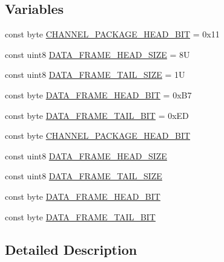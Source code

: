 \subsection*{Variables}
\begin{DoxyCompactItemize}
\item 
const byte \hyperlink{group___a_r_m_const_ga09ff0a5f36e6ede5798a5c19677d5518}{C\-H\-A\-N\-N\-E\-L\-\_\-\-P\-A\-C\-K\-A\-G\-E\-\_\-\-H\-E\-A\-D\-\_\-\-B\-I\-T} = 0x11
\item 
const uint8 \hyperlink{group___a_r_m_const_ga44f6170bf5a312cd050f5a8dbcf3d4de}{D\-A\-T\-A\-\_\-\-F\-R\-A\-M\-E\-\_\-\-H\-E\-A\-D\-\_\-\-S\-I\-Z\-E} = 8\-U
\item 
const uint8 \hyperlink{group___a_r_m_const_gae0773875f4d5422a0c8f39a7e496ab94}{D\-A\-T\-A\-\_\-\-F\-R\-A\-M\-E\-\_\-\-T\-A\-I\-L\-\_\-\-S\-I\-Z\-E} = 1\-U
\item 
const byte \hyperlink{group___a_r_m_const_ga15cb3f9fa8e0523169e74e81acc2bc27}{D\-A\-T\-A\-\_\-\-F\-R\-A\-M\-E\-\_\-\-H\-E\-A\-D\-\_\-\-B\-I\-T} = 0x\-B7
\item 
const byte \hyperlink{group___a_r_m_const_ga9c17d44ef7be0dfaa3d9d42a1e1224c7}{D\-A\-T\-A\-\_\-\-F\-R\-A\-M\-E\-\_\-\-T\-A\-I\-L\-\_\-\-B\-I\-T} = 0x\-E\-D
\item 
const byte \hyperlink{group___a_r_m_const_ga09ff0a5f36e6ede5798a5c19677d5518}{C\-H\-A\-N\-N\-E\-L\-\_\-\-P\-A\-C\-K\-A\-G\-E\-\_\-\-H\-E\-A\-D\-\_\-\-B\-I\-T}
\item 
const uint8 \hyperlink{group___a_r_m_const_ga44f6170bf5a312cd050f5a8dbcf3d4de}{D\-A\-T\-A\-\_\-\-F\-R\-A\-M\-E\-\_\-\-H\-E\-A\-D\-\_\-\-S\-I\-Z\-E}
\item 
const uint8 \hyperlink{group___a_r_m_const_gae0773875f4d5422a0c8f39a7e496ab94}{D\-A\-T\-A\-\_\-\-F\-R\-A\-M\-E\-\_\-\-T\-A\-I\-L\-\_\-\-S\-I\-Z\-E}
\item 
const byte \hyperlink{group___a_r_m_const_ga15cb3f9fa8e0523169e74e81acc2bc27}{D\-A\-T\-A\-\_\-\-F\-R\-A\-M\-E\-\_\-\-H\-E\-A\-D\-\_\-\-B\-I\-T}
\item 
const byte \hyperlink{group___a_r_m_const_ga9c17d44ef7be0dfaa3d9d42a1e1224c7}{D\-A\-T\-A\-\_\-\-F\-R\-A\-M\-E\-\_\-\-T\-A\-I\-L\-\_\-\-B\-I\-T}
\end{DoxyCompactItemize}


\subsection{Detailed Description}


